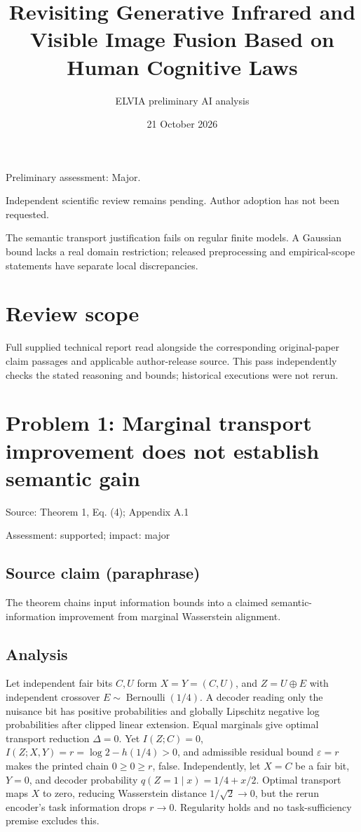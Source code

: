 \documentclass[11pt]{article}
\begin{document}
\title{Revisiting Generative Infrared and Visible Image Fusion Based on Human Cognitive Laws}

\author{ELVIA preliminary AI analysis}\date{21 October 2026}\maketitle

Preliminary assessment: Major.\par

Independent scientific review remains pending. Author adoption has not been requested.

The semantic transport justification fails on regular finite models. A Gaussian bound lacks a real domain restriction; released preprocessing and empirical-scope statements have separate local discrepancies.

\section*{Review scope}

Full supplied technical report read alongside the corresponding original-paper claim passages and applicable author-release source. This pass independently checks the stated reasoning and bounds; historical executions were not rerun.

\section*{Problem 1: Marginal transport improvement does not establish semantic gain}

Source: Theorem 1, Eq. (4); Appendix A.1

Assessment: supported; impact: major

\subsection*{Source claim (paraphrase)}

The theorem chains input information bounds into a claimed semantic-information improvement from marginal Wasserstein alignment.

\subsection*{Analysis}

Let independent fair bits \(C,U\) form \(X=Y=(C,U)\), and \(Z=U\oplus E\) with independent crossover \(E\sim\operatorname{Bernoulli}(1/4)\). A decoder reading only the nuisance bit has positive probabilities and globally Lipschitz negative log probabilities after clipped linear extension. Equal marginals give optimal transport reduction \(\Delta=0\). Yet \(I(Z;C)=0\), \(I(Z;X,Y)=r=\log2-h(1/4)>0\), and admissible residual bound \(\varepsilon=r\) makes the printed chain \(0\ge0\ge r\), false. Independently, let \(X=C\) be a fair bit, \(Y=0\), and decoder probability \(q(Z=1\mid x)=1/4+x/2\). Optimal transport maps \(X\) to zero, reducing Wasserstein distance \(1/\sqrt2\to0\), but the rerun encoder’s task information drops \(r\to0\). Regularity holds and no task-sufficiency premise excludes this.
\end{document}
